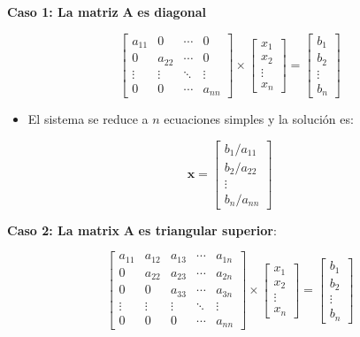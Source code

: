 \documentclass[openany]{book}
\providecommand{\tightlist}{%
  \setlength{\itemsep}{0pt}\setlength{\parskip}{0pt}}
\begin{document}
\textbf{Caso 1: La matriz} \(\mathbf{A}\) \textbf{es diagonal}

\[
\begin{bmatrix}
a_{11} & 0 & \cdots & 0 \\
0 & a_{22} & \cdots & 0 \\
\vdots & \vdots & \ddots & \vdots \\
0 & 0 & \cdots & a_{nn} 
\end{bmatrix}
\times 
\begin{bmatrix}
x_1 \\ x_2 \\ \vdots \\ x_n
\end{bmatrix}
=
\begin{bmatrix}
b_1 \\ b_2 \\ \vdots \\ b_n
\end{bmatrix}
\]

\begin{itemize}
\tightlist
\item
  El sistema se reduce a \(n\) ecuaciones simples y la solución es:
\end{itemize}

\[
\mathbf{x} =
\begin{bmatrix}
    b_1/a_{11} \\ b_2/a_{22} \\ \vdots \\ b_n/a_{nn}
\end{bmatrix}
\]

\textbf{Caso 2: La matrix} \(\mathbf{A}\) \textbf{es triangular superior}:

\[
\begin{bmatrix}
a_{11} & a_{12} & a_{13} & \cdots & a_{1n} \\
0 & a_{22} & a_{23} & \cdots & a_{2n} \\
0 & 0 & a_{33} & \cdots & a_{3n} \\
\vdots & \vdots & \vdots & \ddots & \vdots \\
0 & 0 & 0 & \cdots & a_{nn}
\end{bmatrix}
\times 
\begin{bmatrix}
x_1 \\ x_2 \\ \vdots \\ x_n
\end{bmatrix}
=
\begin{bmatrix}
b_1 \\ b_2 \\ \vdots \\ b_n
\end{bmatrix}
\]
\end{document}
